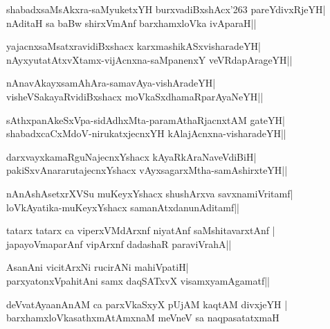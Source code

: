 \begin{shloka}
shabadxsaMsAkxra-saMyuketxYH burxvadiBxshAcx\char'263 pareYdivxRjeYH|\\
nAditaH sa baBw shirxVmAnf barxhamxloVka ivAparaH||
\end{shloka}

\begin{shloka}
yajacnxsaMsatxravidiBxshacx karxmashikASxvisharadeYH|\\
nAyxyutatAtxvXtamx-vijAcnxna-saMpanenxY veVRdapArageYH||
\end{shloka}

\begin{shloka}
nAnavAkayxsamAhAra-samavAya-vishAradeYH|\\
visheVSakayaRvidiBxshacx moVkaSxdhamaRparAyaNeYH||
\end{shloka}

\begin{shloka}
sAthxpanAkeSxVpa-sidAdhxMta-paramAthaRjacnxtAM gateYH|\\
shabadxcaCxMdoV-nirukatxjecnxYH kAlajAcnxna-visharadeYH||
\end{shloka}

\begin{shloka}
darxvayxkamaRguNajecnxYshacx kAyaRkAraNaveVdiBiH|\\
pakiSxvAnararutajecnxYshacx vAyxsagarxMtha-samAshirxteYH||\\
\end{shloka}

\begin{shloka}
nAnAshAsetxrXVSu muKeyxYshacx shushArxva savxnamiVritamf|\\
loVkAyatika-muKeyxYshacx samanAtxdanunAditamf||
\end{shloka}

\begin{shloka}
tatarx tatarx ca viperxVMdArxnf niyatAnf saMshitavarxtAnf |\\
japayoVmaparAnf vipArxnf dadashaR paraviVrahA||
\end{shloka}

\begin{shloka}
AsanAni vicitArxNi rucirANi mahiVpatiH|\\
parxyatonxVpahitAni samx daqSATxvX visamxyamAgamatf||
\end{shloka}

\begin{shloka}
deVvatAyaanAnAM ca parxVkaSxyX pUjAM kaqtAM divxjeYH |\\
barxhamxloVkasathxmAtAmxnaM meVneV sa naqpasatatxmaH
\end{shloka}

